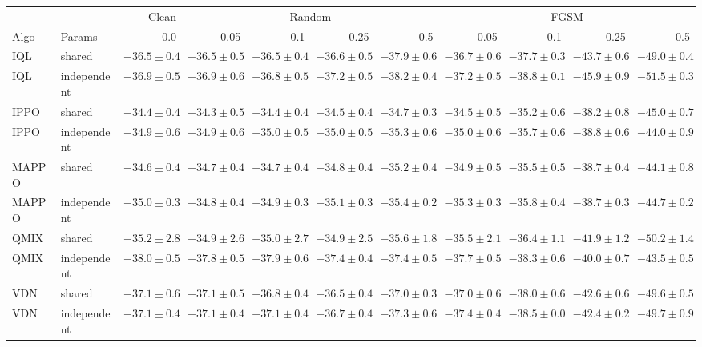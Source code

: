 \begin{tabular}{llrrrrrrrrr}
\toprule
 & & Clean & \multicolumn{4}{c}{Random} & \multicolumn{4}{c}{FGSM} \\
\cmidrule(lr){4-7}\cmidrule(lr){8-11}
Algo & Params & 0.0 & 0.05 & 0.1 & 0.25 & 0.5 & 0.05 & 0.1 & 0.25 & 0.5 \\
\midrule
IQL & shared & $-36.5\pm0.4$ & $-36.5\pm0.5$ & $-36.5\pm0.4$ & $-36.6\pm0.5$ & $-37.9\pm0.6$ & $-36.7\pm0.6$ & $-37.7\pm0.3$ & $-43.7\pm0.6$ & $-49.0\pm0.4$ \\
IQL & independent & $-36.9\pm0.5$ & $-36.9\pm0.6$ & $-36.8\pm0.5$ & $-37.2\pm0.5$ & $-38.2\pm0.4$ & $-37.2\pm0.5$ & $-38.8\pm0.1$ & $-45.9\pm0.9$ & $-51.5\pm0.3$ \\
\midrule
IPPO & shared & $-34.4\pm0.4$ & $-34.3\pm0.5$ & $-34.4\pm0.4$ & $-34.5\pm0.4$ & $-34.7\pm0.3$ & $-34.5\pm0.5$ & $-35.2\pm0.6$ & $-38.2\pm0.8$ & $-45.0\pm0.7$ \\
IPPO & independent & $-34.9\pm0.6$ & $-34.9\pm0.6$ & $-35.0\pm0.5$ & $-35.0\pm0.5$ & $-35.3\pm0.6$ & $-35.0\pm0.6$ & $-35.7\pm0.6$ & $-38.8\pm0.6$ & $-44.0\pm0.9$ \\
\midrule
MAPPO & shared & $-34.6\pm0.4$ & $-34.7\pm0.4$ & $-34.7\pm0.4$ & $-34.8\pm0.4$ & $-35.2\pm0.4$ & $-34.9\pm0.5$ & $-35.5\pm0.5$ & $-38.7\pm0.4$ & $-44.1\pm0.8$ \\
MAPPO & independent & $-35.0\pm0.3$ & $-34.8\pm0.4$ & $-34.9\pm0.3$ & $-35.1\pm0.3$ & $-35.4\pm0.2$ & $-35.3\pm0.3$ & $-35.8\pm0.4$ & $-38.7\pm0.3$ & $-44.7\pm0.2$ \\
\midrule
QMIX & shared & $-35.2\pm2.8$ & $-34.9\pm2.6$ & $-35.0\pm2.7$ & $-34.9\pm2.5$ & $-35.6\pm1.8$ & $-35.5\pm2.1$ & $-36.4\pm1.1$ & $-41.9\pm1.2$ & $-50.2\pm1.4$ \\
QMIX & independent & $-38.0\pm0.5$ & $-37.8\pm0.5$ & $-37.9\pm0.6$ & $-37.4\pm0.4$ & $-37.4\pm0.5$ & $-37.7\pm0.5$ & $-38.3\pm0.6$ & $-40.0\pm0.7$ & $-43.5\pm0.5$ \\
\midrule
VDN & shared & $-37.1\pm0.6$ & $-37.1\pm0.5$ & $-36.8\pm0.4$ & $-36.5\pm0.4$ & $-37.0\pm0.3$ & $-37.0\pm0.6$ & $-38.0\pm0.6$ & $-42.6\pm0.6$ & $-49.6\pm0.5$ \\
VDN & independent & $-37.1\pm0.4$ & $-37.1\pm0.4$ & $-37.1\pm0.4$ & $-36.7\pm0.4$ & $-37.3\pm0.6$ & $-37.4\pm0.4$ & $-38.5\pm0.0$ & $-42.4\pm0.2$ & $-49.7\pm0.9$ \\
\bottomrule
\end{tabular}